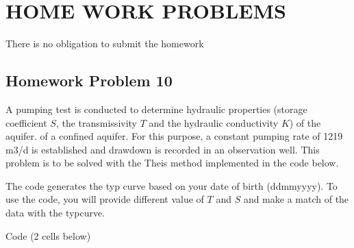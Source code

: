 \documentclass[letterpaper,10pt,english]{jupyterBook}
\begin{document}
\section{HOME WORK PROBLEMS}
\label{\detokenize{content/tutorials/T7/tutorial_07:home-work-problems}}
\sphinxAtStartPar
{}

\sphinxAtStartPar


\sphinxAtStartPar
There is no obligation to submit the homework



\sphinxAtStartPar
{}


\subsection{Homework Problem 10}
\label{\detokenize{content/tutorials/T7/tutorial_07:homework-problem-10}}
\sphinxAtStartPar
A pumping test is conducted to determine hydraulic properties (storage coefficient \(S\), the transmissivity \(T\) and the hydraulic conductivity \(K\)) of
the aquifer. of a confined aquifer. For this purpose, a constant
pumping rate of 1219 m3/d is established and drawdown is recorded in an observation well. This problem is to be
solved with the Theis method implemented in the code below.

\sphinxAtStartPar
The code generates the typ curve based on your date of birth (ddmmyyyy). To use the code, you will provide different value of \(T\) and \(S\) and make a match of the data with the typ\sphinxhyphen{}curve.

\sphinxAtStartPar
Code (2 cells below)
\end{document}
